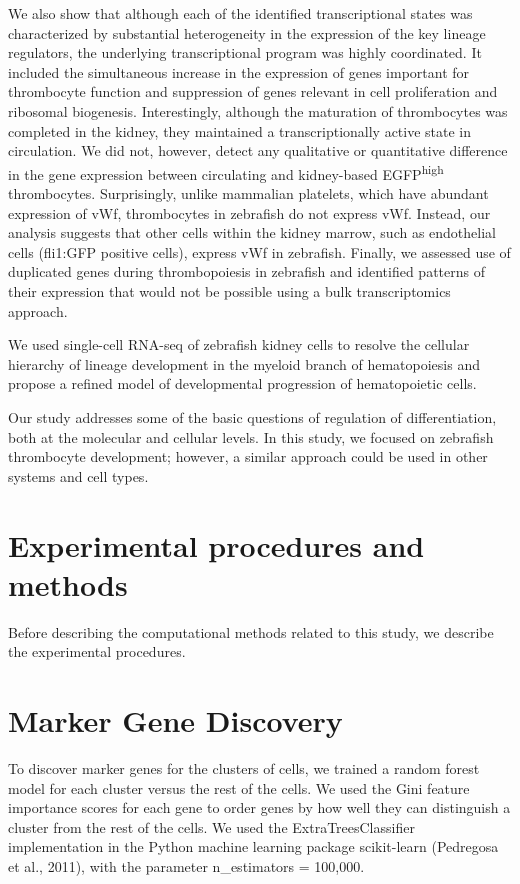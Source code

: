 We also show that although each of the identified transcriptional states was characterized by substantial heterogeneity in the expression of the key lineage regulators, the underlying transcriptional program was highly coordinated. It included the simultaneous increase in the expression of genes important
for thrombocyte function and suppression of genes relevant in cell proliferation and ribosomal biogenesis. Interestingly, although the maturation of thrombocytes was completed in the kidney, they maintained a transcriptionally active state in circulation. We did not, however, detect any qualitative or quantitative difference in the gene expression between circulating and kidney-based EGFP\textsuperscript{high} thrombocytes. Surprisingly, unlike mammalian platelets, which have abundant expression of vWf, thrombocytes in zebrafish do not express vWf. Instead, our analysis suggests that other cells within the kidney marrow, such as endothelial cells (fli1:GFP positive cells), express vWf in zebrafish. Finally, we assessed use of duplicated genes during thrombopoiesis in zebrafish and identified patterns of their expression that would not be possible using a bulk transcriptomics approach.

We used single-cell RNA-seq of zebrafish kidney cells to resolve the cellular hierarchy of lineage development in the myeloid branch of hematopoiesis and propose a refined model of developmental progression of hematopoietic cells.

Our study addresses some of the basic questions of regulation of differentiation, both at the molecular and cellular levels. In this study, we focused on zebrafish thrombocyte development; however, a similar approach could be used in other systems and cell types.

\section{Experimental procedures and methods}

Before describing the computational methods related to this study, we describe the experimental procedures.

\section{Marker Gene Discovery}

To discover marker genes for the clusters of cells, we trained a random forest model for each cluster versus the rest of the cells. We used the Gini feature importance scores for each gene to order genes by how well they can distinguish a cluster from the rest of the cells. We used the ExtraTreesClassifier  \cite{Geurts2006-qg} implementation in the Python machine learning package scikit-learn (Pedregosa et al., 2011), with the parameter n\_estimators = 100,000.
              
